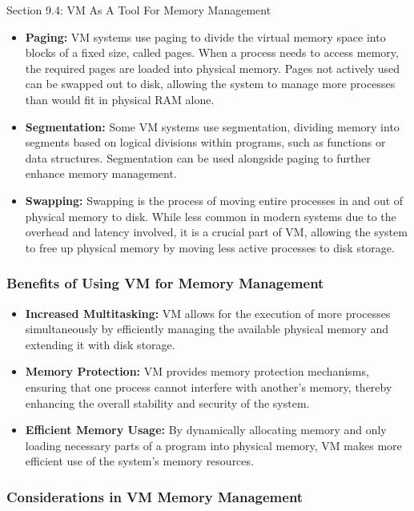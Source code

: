 \begin{notes}{Section 9.4: VM As A Tool For Memory Management}
    \begin{itemize}
        \item \textbf{Paging:} VM systems use paging to divide the virtual memory space into blocks of a fixed size, called pages. When a process needs to access memory, the required pages are loaded 
        into physical memory. Pages not actively used can be swapped out to disk, allowing the system to manage more processes than would fit in physical RAM alone.
        \item \textbf{Segmentation:} Some VM systems use segmentation, dividing memory into segments based on logical divisions within programs, such as functions or data structures. Segmentation can 
        be used alongside paging to further enhance memory management.
        \item \textbf{Swapping:} Swapping is the process of moving entire processes in and out of physical memory to disk. While less common in modern systems due to the overhead and latency involved, 
        it is a crucial part of VM, allowing the system to free up physical memory by moving less active processes to disk storage.
    \end{itemize}
    
    \subsubsection*{Benefits of Using VM for Memory Management}
    
    \begin{itemize}
        \item \textbf{Increased Multitasking:} VM allows for the execution of more processes simultaneously by efficiently managing the available physical memory and extending it with disk storage.
        \item \textbf{Memory Protection:} VM provides memory protection mechanisms, ensuring that one process cannot interfere with another's memory, thereby enhancing the overall stability and 
        security of the system.
        \item \textbf{Efficient Memory Usage:} By dynamically allocating memory and only loading necessary parts of a program into physical memory, VM makes more efficient use of the system's 
        memory resources.
    \end{itemize}
    
    \subsubsection*{Considerations in VM Memory Management}
    

\end{notes}
